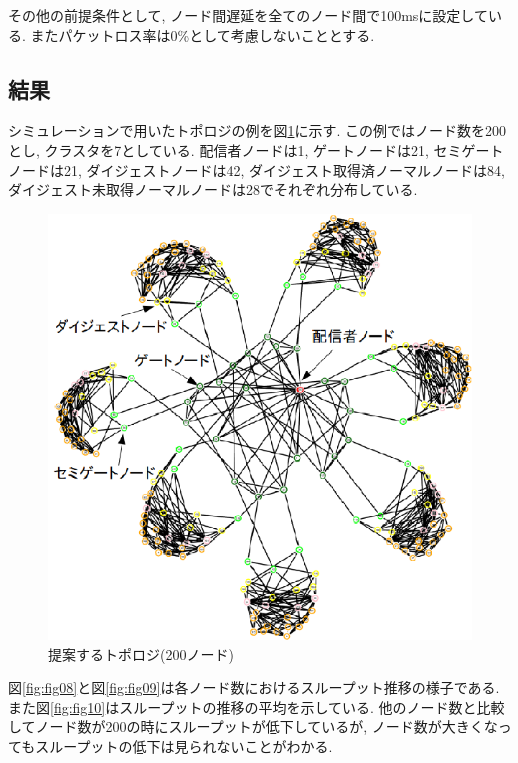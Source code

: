 \documentclass[letter]{ieicej}
\begin{document}
その他の前提条件として, ノード間遅延を全てのノード間で100msに設定している. またパケットロス率は0\%として考慮しないこととする.

\subsection{結果}
シミュレーションで用いたトポロジの例を図\ref{fig:fig07}に示す. この例ではノード数を200とし, クラスタを7としている. 配信者ノードは1, ゲートノードは21, セミゲートノードは21, ダイジェストノードは42, ダイジェスト取得済ノーマルノードは84, ダイジェスト未取得ノーマルノードは28でそれぞれ分布している.

\begin{figure}[h]
  \begin{center}
    \includegraphics{topology.eps}
  \end{center}
  \caption{提案するトポロジ(200ノード)}
  \label{fig:fig07}
\end{figure}

図\ref{fig:fig08}と図\ref{fig:fig09}は各ノード数におけるスループット推移の様子である. また図\ref{fig:fig10}はスループットの推移の平均を示している. 他のノード数と比較してノード数が200の時にスループットが低下しているが, ノード数が大きくなってもスループットの低下は見られないことがわかる.
\end{document}
